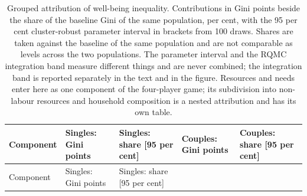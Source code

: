 \small\setlength{\tabcolsep}{3pt}\begin{longtable}[]{@{}
  >{\raggedright\arraybackslash}p{}
  >{\raggedright\arraybackslash}p{}
  >{\raggedright\arraybackslash}p{}
  >{\raggedright\arraybackslash}p{}
  >{\raggedright\arraybackslash}p{}@{}}
\caption{Grouped attribution of well-being inequality. Contributions in Gini points beside the share of the baseline Gini of the same population, per cent, with the 95 per cent cluster-robust parameter interval in brackets from 100 draws. Shares are taken against the baseline of the same population and are not comparable as levels across the two populations. The parameter interval and the RQMC integration band measure different things and are never combined; the integration band is reported separately in the text and in the figure. Resources and needs enter here as one component of the four-player game; its subdivision into non-labour resources and household composition is a nested attribution and has its own table.}\tabularnewline
\toprule\noalign{}
\begin{minipage}[b]{\linewidth}\raggedright
Component
\end{minipage} & \begin{minipage}[b]{\linewidth}\raggedright
Singles: Gini points
\end{minipage} & \begin{minipage}[b]{\linewidth}\raggedright
Singles: share {[}95 per cent{]}
\end{minipage} & \begin{minipage}[b]{\linewidth}\raggedright
Couples: Gini points
\end{minipage} & \begin{minipage}[b]{\linewidth}\raggedright
Couples: share {[}95 per cent{]}
\end{minipage} \\
\midrule\noalign{}
\endfirsthead
\toprule\noalign{}
\begin{minipage}[b]{\linewidth}\raggedright
Component
\end{minipage} & \begin{minipage}[b]{\linewidth}\raggedright
Singles: Gini points
\end{minipage} & \begin{minipage}[b]{\linewidth}\raggedright
Singles: share {[}95 per cent{]}

\end{minipage}
\end{longtable}
